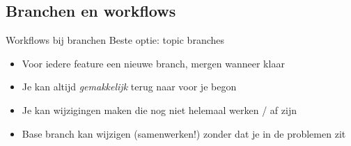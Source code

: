 \subsection{Branchen en workflows}
\begin{frame}{Workflows bij branchen}
	\alert{Beste optie: topic branches}
	\begin{itemize}
		\item Voor iedere feature een nieuwe branch, mergen wanneer klaar
		\item Je kan altijd \emph{gemakkelijk} terug naar voor je begon
		\item Je kan wijzigingen maken die nog niet helemaal werken / af zijn
		\item Base branch kan wijzigen (samenwerken!) zonder dat je in de problemen zit
	\end{itemize}
\end{frame}
